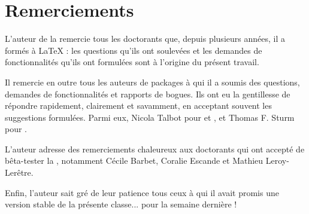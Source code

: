 \section{Remerciements}
\label{sec:remerciements}

L'auteur de la \yatcl{} remercie tous les doctorants que, depuis plusieurs
années, il a formés à \LaTeX{} : les questions qu'ils ont soulevées et les
demandes de fonctionnalités qu'ils ont formulées sont à l'origine du présent
travail.

Il remercie en outre tous les auteurs de packages à qui il a soumis  des questions, demandes de fonctionnalités et
rapports de bogues. Ils ont eu la gentillesse de répondre rapidement,
clairement et savamment, en acceptant souvent les suggestions formulées. Parmi
eux, Nicola Talbot pour  et , et Thomas
F. Sturm pour .

L'auteur adresse des remerciements chaleureux aux doctorants qui ont accepté de
bêta-tester la \yatcl{}, notamment Cécile Barbet, Coralie Escande et Mathieu
Leroy-Lerêtre.

Enfin, l'auteur sait gré de leur patience tous ceux à qui il avait promis une
version stable de la présente classe... pour la semaine dernière !

%
\iffalse
\fi
